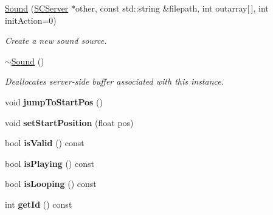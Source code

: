 \begin{DoxyCompactItemize}
\item 
\hypertarget{classsc_1_1Sound_ab8da540f95ed9e91d18291eabc1d41aa}{\hyperlink{classsc_1_1Sound_ab8da540f95ed9e91d18291eabc1d41aa}{Sound} (\hyperlink{classsc_1_1SCServer}{S\-C\-Server} $\ast$other, const std\-::string \&filepath, int outarray\mbox{[}$\,$\mbox{]}, int init\-Action=0)}\label{classsc_1_1Sound_ab8da540f95ed9e91d18291eabc1d41aa}

\begin{DoxyCompactList}\small\item\em Create a new sound source. \end{DoxyCompactList}\item 
\hypertarget{classsc_1_1Sound_ac05e395b00c36c796bb8aa707d1011af}{\hyperlink{classsc_1_1Sound_ac05e395b00c36c796bb8aa707d1011af}{$\sim$\-Sound} ()}\label{classsc_1_1Sound_ac05e395b00c36c796bb8aa707d1011af}

\begin{DoxyCompactList}\small\item\em Deallocates server-\/side buffer associated with this instance. \end{DoxyCompactList}\item 
\hypertarget{classsc_1_1Sound_aa24cb289f2b0ea29cb5328bf7d3e3d73}{void {\bfseries jump\-To\-Start\-Pos} ()}\label{classsc_1_1Sound_aa24cb289f2b0ea29cb5328bf7d3e3d73}

\item 
\hypertarget{classsc_1_1Sound_afe2605c8645f068fca123da81c3ac9fd}{void {\bfseries set\-Start\-Position} (float pos)}\label{classsc_1_1Sound_afe2605c8645f068fca123da81c3ac9fd}

\item 
\hypertarget{classsc_1_1Sound_aed59d0e68d4464564d0752b5a01bc3f4}{bool {\bfseries is\-Valid} () const }\label{classsc_1_1Sound_aed59d0e68d4464564d0752b5a01bc3f4}

\item 
\hypertarget{classsc_1_1Sound_a08c97f8897f7fe294c29748e8cbb0747}{bool {\bfseries is\-Playing} () const }\label{classsc_1_1Sound_a08c97f8897f7fe294c29748e8cbb0747}

\item 
\hypertarget{classsc_1_1Sound_a2846f59cbeeab0cfb28788251a428d94}{bool {\bfseries is\-Looping} () const }\label{classsc_1_1Sound_a2846f59cbeeab0cfb28788251a428d94}

\item 
\hypertarget{classsc_1_1Sound_afe2b26f7e735556cc2cfe5803c60397d}{int {\bfseries get\-Id} () const }\label{classsc_1_1Sound_afe2b26f7e735556cc2cfe5803c60397d}


\end{DoxyCompactItemize}
